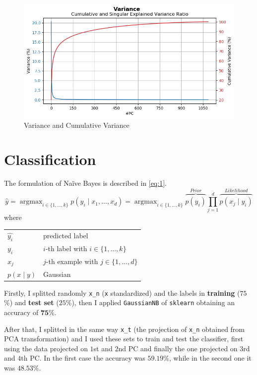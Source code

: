\documentclass[a4paper, 11pt]{article}
\makeatletter
\DeclareMathOperator*{\argmax}{argmax} %
\newenvironment{conditions}
{\par\vspace{\abovedisplayskip}\noindent\begin{tabular}{>{$}l<{$} @{${}={}$} l}}
	{\end{tabular}\par\vspace{\belowdisplayskip}}
\makeatother
\begin{document}
	\begin{figure}[ht!]
		\centering
		\includegraphics[height=0.4\paperwidth]{img/fig03.png}
		\caption{Variance and Cumulative Variance}
		\label{fig:variance}
	\end{figure}
	
	
	\section{Classification}
		
	The formulation of Na\"ive Bayes is described in \cref{eq:1}.
	\begin{equation} \label{eq:1}
		\hat{y}=\argmax_{i \in \{1,\dots,k\}} p ( y_i \mid x_1, \dots, x_d) = \argmax_{i \in \{1,\dots,k\}}\overbrace{p(y_i)}^{Prior} \prod_{j=1}^{d}\overbrace{p(x_j\mid y_i)}^{Likelihood}
	\end{equation}
	where
	\begin{conditions}
		\hat{y_i}	&	predicted label \\
		y_i			&	$i$-th label with $i \in \{1,\dots,k\}$\\
		x_j			&  	$j$-th example with $j \in \{1,\dots,d\}$   \\   
		p(x\mid y) 	&	Gaussian
	\end{conditions}
	
	Firstly, I splitted randomly \texttt{x\_n} (\texttt{x} standardized) and the labels in \textbf{training} ($75$\%) and \textbf{test set} ($25$\%), then I applied \texttt{GaussianNB} of \texttt{sklearn} obtaining an accuracy of $\boldsymbol{75\%}$.
	
	After that, I splitted in the same way \texttt{x\_t} (the projection of \texttt{x\_n} obtained from PCA transformation) and I used these sets to train and test the classifier, first using the data projected on $1$st and $2$nd PC and finally the one projected on $3$rd and $4$th PC. In the first case the accuracy was $\boldsymbol{59.19\%}$, while in the second one it was $\boldsymbol{48.53\%}$.
	
\end{document}
